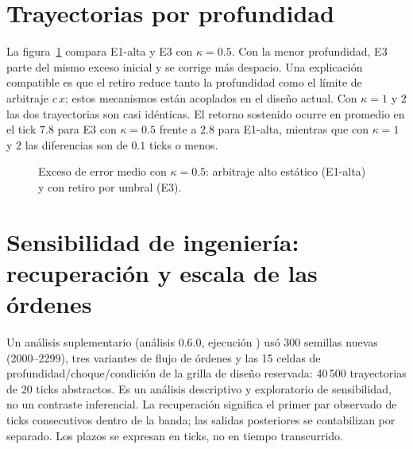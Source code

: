 \section{Trayectorias por profundidad}

La figura~\ref{fig:prof} compara E1-alta y E3 con $\kappa=0.5$. Con la menor profundidad, E3 parte del mismo exceso inicial y se corrige más despacio. Una explicación compatible es que el retiro reduce tanto la profundidad como el límite de arbitraje $c\,x$; estos mecanismos están acoplados en el diseño actual. Con $\kappa=1$ y $2$ las dos trayectorias son casi idénticas. El retorno sostenido ocurre en promedio en el tick $7.8$ para E3 con $\kappa=0.5$ frente a $2.8$ para E1-alta, mientras que con $\kappa=1$ y $2$ las diferencias son de $0.1$ ticks o menos.

\begin{figure}[htbp]
\centering
{}
\caption{Exceso de error medio con $\kappa=0.5$: arbitraje alto estático (E1-alta) y con retiro por umbral (E3).}
\label{fig:prof}
\end{figure}

\section{Sensibilidad de ingeniería: recuperación y escala de las órdenes}
\label{sec:engineering-sensitivity}

Un análisis suplementario (análisis 0.6.0, ejecución \code{\EngineeringRunID}) usó 300 semillas nuevas (2000--2299), tres variantes de flujo de órdenes y las 15 celdas de profundidad/choque/condición de la grilla de diseño reservada: 40\,500 trayectorias de 20 ticks abstractos. Es un análisis descriptivo y exploratorio de sensibilidad, no un contraste inferencial. La recuperación significa el primer par observado de ticks consecutivos dentro de la banda; las salidas posteriores se contabilizan por separado. Los plazos se expresan en ticks, no en tiempo transcurrido.

